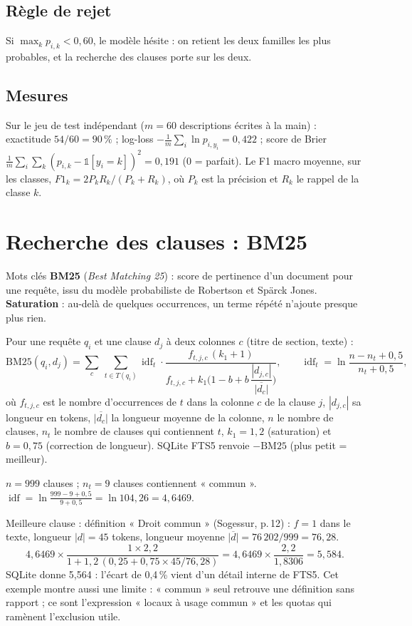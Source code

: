 \documentclass[11pt,a4paper]{article}
\DeclareMathOperator{\idf}{idf}
\begin{document}
\subsection{Règle de rejet}
Si $\max_k p_{i,k} < 0{,}60$, le modèle hésite : on retient les deux familles les plus probables, et
la recherche des clauses porte sur les deux.

\subsection{Mesures}
Sur le jeu de test indépendant ($m=60$ descriptions écrites à la main) :
exactitude $54/60 = 90\,\%$ ; log-loss
$-\frac1m\sum_i \ln p_{i,y_i} = 0{,}422$ ; score de Brier
$\frac1m\sum_i\sum_k (p_{i,k}-\mathbb{1}[y_i=k])^2 = 0{,}191$ (0 = parfait).
Le F1 macro moyenne, sur les classes, $F1_k = 2P_kR_k/(P_k+R_k)$, où $P_k$ est la précision et
$R_k$ le rappel de la classe $k$.

\section{Recherche des clauses : BM25}

\begin{defbox}{Mots clés}
\textbf{BM25} (\emph{Best Matching 25}) : score de pertinence d'un document pour une requête, issu
du modèle probabiliste de Robertson et Spärck Jones. \textbf{Saturation} : au-delà de quelques
occurrences, un terme répété n'ajoute presque plus rien.
\end{defbox}

Pour une requête $q_i$ et une clause $d_j$ à deux colonnes $c$ (titre de section, texte) :
\[
\mathrm{BM25}(q_i,d_j) = \sum_{c}\ \sum_{t \in T(q_i)} \idf_t \cdot
\frac{f_{t,j,c}\,(k_1+1)}{f_{t,j,c} + k_1\Big(1-b+b\,\dfrac{|d_{j,c}|}{\overline{|d_c|}}\Big)},
\qquad
\idf_t = \ln\frac{n-n_t+0{,}5}{n_t+0{,}5},
\]
où $f_{t,j,c}$ est le nombre d'occurrences de $t$ dans la colonne $c$ de la clause $j$, $|d_{j,c}|$
sa longueur en tokens, $\overline{|d_c|}$ la longueur moyenne de la colonne, $n$ le nombre de clauses,
$n_t$ le nombre de clauses qui contiennent $t$, $k_1=1{,}2$ (saturation) et $b=0{,}75$ (correction
de longueur). SQLite FTS5 renvoie $-\mathrm{BM25}$ (plus petit = meilleur).

\begin{exemple}
$n = 999$ clauses ; $n_t = 9$ clauses contiennent « commun ».
$\idf = \ln\frac{999-9+0{,}5}{9+0{,}5} = \ln 104{,}26 = 4{,}6469$.

Meilleure clause : définition « Droit commun » (Sogessur, p.\,12) : $f=1$ dans le texte, longueur
$|d|=45$ tokens, longueur moyenne $\overline{|d|} = 76\,202/999 = 76{,}28$.
\[
4{,}6469\times\frac{1\times2{,}2}{1+1{,}2\,(0{,}25+0{,}75\times45/76{,}28)} = 4{,}6469\times\frac{2{,}2}{1{,}8306} = 5{,}584 .
\]
SQLite donne 5,564 : l'écart de 0,4\,\% vient d'un détail interne de FTS5. Cet exemple montre
aussi une limite : « commun » seul retrouve une définition sans rapport ; ce sont l'expression
« locaux à usage commun » et les quotas qui ramènent l'exclusion utile.
\end{exemple}
\end{document}
